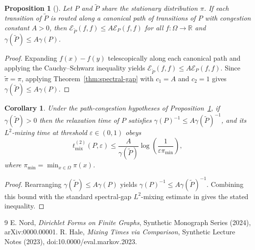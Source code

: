 \documentclass{article}
\newtheorem{proposition}[theorem]{Proposition}
\newtheorem{corollary}[theorem]{Corollary}
\theoremstyle{definition}
\begin{document}
\begin{proposition}[{\cite[Theorem~2.1]{nord2024operator}}]
\label{prop:comparison}
Let $P$ and $\widetilde{P}$ share the stationary distribution $\pi$. If each
transition of $\widetilde{P}$ is routed along a canonical path of transitions
of $P$ with congestion constant $A > 0$, then
$\mathcal{E}_{\widetilde{P}}(f,f) \le A \mathcal{E}_P(f,f)$ for all
$f : \Omega \to \mathbb{R}$ and $\gamma(\widetilde{P}) \le A \gamma(P)$.
\end{proposition}
\begin{proof}
Expanding $f(x) - f(y)$ telescopically along each canonical path and applying
the Cauchy--Schwarz inequality yields
$\mathcal{E}_{\widetilde{P}}(f,f) \le A \mathcal{E}_P(f,f)$. Since
$\widetilde{\pi} = \pi$, applying Theorem~\ref{thm:spectral-gap} with
$c_1 = A$ and $c_2 = 1$ gives $\gamma(\widetilde{P}) \le A \gamma(P)$.
\end{proof}

\begin{corollary}
\label{cor:mixing}
Under the path-congestion hypotheses of Proposition~\ref{prop:comparison}, if
$\gamma(\widetilde{P}) > 0$ then the relaxation time of $P$ satisfies
$\gamma(P)^{-1} \le A \gamma(\widetilde{P})^{-1}$, and its $L^2$-mixing time
at threshold $\varepsilon \in (0,1)$ obeys
\[
t_{\mathrm{mix}}^{(2)}(P, \varepsilon)
\le \frac{A}{\gamma(\widetilde{P})} \log\left(\frac{1}{\varepsilon \pi_{\min}}\right),
\]
where $\pi_{\min} = \min_{x \in \Omega} \pi(x)$.
\end{corollary}
\begin{proof}
Rearranging $\gamma(\widetilde{P}) \le A \gamma(P)$ yields
$\gamma(P)^{-1} \le A \gamma(\widetilde{P})^{-1}$. Combining this bound with
the standard spectral-gap $L^2$-mixing estimate in
\cite[Proposition~4.3]{hale2023bounds} gives the stated inequality.
\end{proof}

\begin{thebibliography}{9}
 E. Nord, \emph{Dirichlet Forms on Finite Graphs}, Synthetic Monograph Series (2024), arXiv:0000.00001.
 R. Hale, \emph{Mixing Times via Comparison}, Synthetic Lecture Notes (2023), doi:10.0000/eval.markov.2023.
\end{thebibliography}
\end{document}

